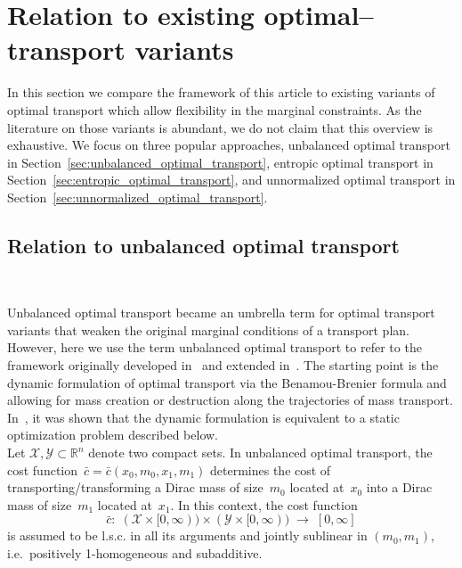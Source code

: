 \documentclass{article}
\theoremstyle{definition}
\def\R{\mathbb{R}}
\begin{document}
\section{Relation to existing optimal–transport variants}
\label{sec:literature}

In this section we compare the framework of this article to existing variants of optimal transport which allow flexibility in the marginal constraints. As the literature on those variants is abundant, we do not claim that this overview is exhaustive. We focus on three popular approaches,  unbalanced optimal transport in Section~\ref{sec:unbalanced_optimal_transport}, entropic optimal transport in Section~\ref{sec:entropic_optimal_transport}, and unnormalized optimal transport in Section~\ref{sec:unnormalized_optimal_transport}. \\




\subsection{Relation to unbalanced optimal transport}~\label{sec:unbalanced_optimal_transport}

Unbalanced optimal transport became an umbrella term for optimal transport variants that weaken the original marginal conditions of a transport plan. However, here we use the term unbalanced optimal transport to refer to the framework originally developed in~\cite{kondratyev2016new, chizat2018interpolating} and extended in~\cite{chizat2018unbalanced}. The starting point is the dynamic formulation of optimal transport via the Benamou-Brenier formula and allowing for mass creation or destruction along the trajectories of mass transport. In~\cite{chizat2018unbalanced}, it was shown that the dynamic formulation is equivalent to a static optimization problem described below. \\

Let $\mathcal{X},\mathcal{Y} \subset \R^n$ denote two compact sets. In unbalanced optimal transport, the cost function~$ \bar c= \bar c(x_0,m_0,x_1,m_1)$ determines the cost of transporting/transforming a Dirac mass of size~$m_0$ located at~$x_0$ into a Dirac mass of size~$m_1$ located at~$x_1$. In this context, the cost function 
\[
\bar c \colon\; (\mathcal{X}\times[0,\infty)) \times (\mathcal{Y}\times[0,\infty))  \;\to\; [0,\infty]
\]
is assumed to be l.s.c. in all its arguments and jointly sublinear in $(m_0, m_1)$, i.e.~positively 1-homogeneous and subadditive. 
\end{document}

